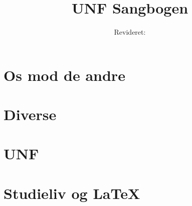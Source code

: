 \documentclass[12pt]{book}
\title{UNF Sangbogen}
\author{}
\date{Revideret:  \RevDate}
\newcommand{\CHeadFont}{\normalsize\rm}         %
\begin{document}
\maketitle
\mainmatter
\ifWordBk
  \twocolumn
\fi


\onecolumn
\chapter*{Os mod de andre}
\twocolumn









\onecolumn
\chapter*{Diverse}
\twocolumn






\fancyhead[CE,CO]{\CHeadFont\thepage}



\onecolumn
\chapter*{UNF}
\twocolumn







% 

\onecolumn
\chapter*{Studieliv og \LaTeX}
\twocolumn









\end{document}

